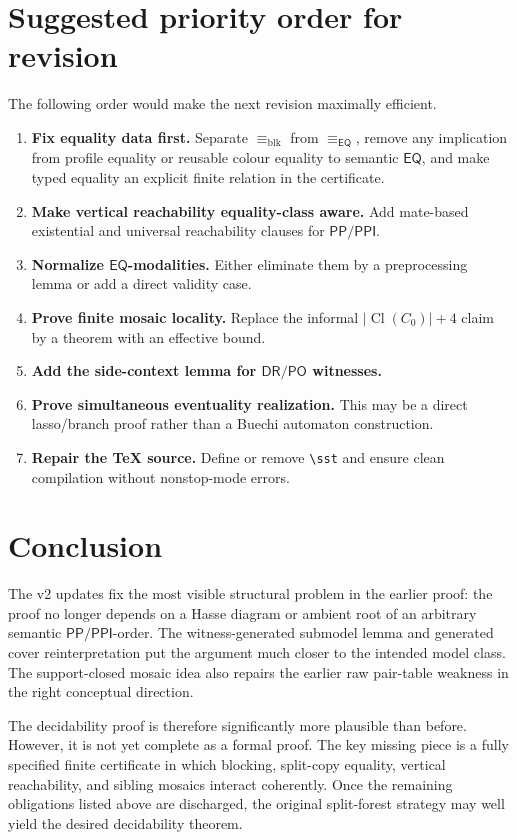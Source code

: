 \documentclass[11pt]{article}
\newcommand{\PP}{\mathsf{PP}}
\newcommand{\PPI}{\mathsf{PPI}}
\newcommand{\PO}{\mathsf{PO}}
\newcommand{\DR}{\mathsf{DR}}
\newcommand{\EQ}{\mathsf{EQ}}
\newcommand{\Cl}{\operatorname{Cl}}
\newcommand{\eqcong}{\equiv_{\EQ}}
\newcommand{\blk}{\equiv_{\mathrm{blk}}}
\begin{document}
\section{Suggested priority order for revision}

The following order would make the next revision maximally efficient.

\begin{enumerate}[leftmargin=2em]
\item \textbf{Fix equality data first.}  Separate \(\blk\) from \(\eqcong\),
  remove any implication from profile equality or reusable colour equality to
  semantic \(\EQ\), and make typed equality an explicit finite relation in the
  certificate.
\item \textbf{Make vertical reachability equality-class aware.}  Add mate-based
  existential and universal reachability clauses for \(\PP/\PPI\).
\item \textbf{Normalize \(\EQ\)-modalities.}  Either eliminate them by a
  preprocessing lemma or add a direct validity case.
\item \textbf{Prove finite mosaic locality.}  Replace the informal
  \(|\Cl(C_0)|+4\) claim by a theorem with an effective bound.
\item \textbf{Add the side-context lemma for \(\DR/\PO\) witnesses.}
\item \textbf{Prove simultaneous eventuality realization.}  This may be a direct
  lasso/branch proof rather than a Buechi automaton construction.
\item \textbf{Repair the TeX source.}  Define or remove \verb|\sst| and ensure
  clean compilation without nonstop-mode errors.
\end{enumerate}

\section{Conclusion}

The v2 updates fix the most visible structural problem in the earlier proof: the
proof no longer depends on a Hasse diagram or ambient root of an arbitrary
semantic \(\PP/\PPI\)-order.  The witness-generated submodel lemma and generated
cover reinterpretation put the argument much closer to the intended model class.
The support-closed mosaic idea also repairs the earlier raw pair-table weakness
in the right conceptual direction.

The decidability proof is therefore significantly more plausible than before.
However, it is not yet complete as a formal proof.  The key missing piece is a
fully specified finite certificate in which blocking, split-copy equality,
vertical reachability, and sibling mosaics interact coherently.  Once the
remaining obligations listed above are discharged, the original split-forest
strategy may well yield the desired decidability theorem.
\end{document}
